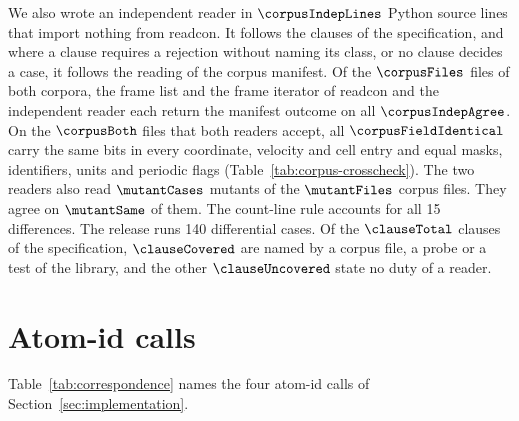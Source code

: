 We also wrote an independent reader in \(\corpusIndepLines\) Python
source lines that import nothing from readcon.
It follows the clauses of the specification, and where a clause requires
a rejection without naming its class, or no clause decides a case, it
follows the reading of the corpus manifest.
Of the \(\corpusFiles\) files of both corpora, the frame list and the
frame iterator of readcon and the independent reader each return the
manifest outcome on all \(\corpusIndepAgree\).
On the \(\corpusBoth\) files that both readers accept, all
\(\corpusFieldIdentical\) carry the same bits in every coordinate,
velocity and cell entry and equal masks, identifiers, units and periodic
flags (Table~\ref*{tab:corpus-crosscheck}).
The two readers also read \(\mutantCases\) mutants of the
\(\mutantFiles\) corpus files.
They agree on \(\mutantSame\) of them.
The count-line rule accounts for all 15 differences.
The release runs 140 differential cases.
Of the \(\clauseTotal\) clauses of the specification, \(\clauseCovered\)
are named by a corpus file, a probe or a test of the library, and the
other \(\clauseUncovered\) state no duty of a reader.

\section{Atom-id calls}\label{sec:supp-api}
Table~\ref{tab:correspondence} names the four atom-id calls of Section~\ref{sec:implementation}.
\begin{table}[tbp]
\centering
\caption{The four atom-id calls of the released API in readcon-core 0.22.0.
In C++ the consistency check is the free function.
The other three C++ calls are members of \texttt{ConFrame}.}
\label{tab:correspondence}
\footnotesize
{}
\end{table}

